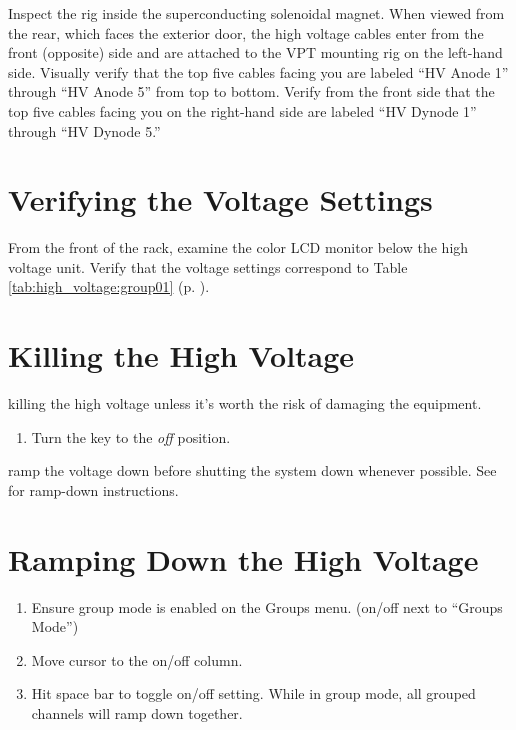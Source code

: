 Inspect the rig inside the superconducting solenoidal magnet.  When viewed from the rear, which faces the exterior door, the high voltage cables enter from the front (opposite) side and are attached to the VPT mounting rig on the left-hand side.  Visually verify that the top five cables facing you are labeled ``HV Anode 1'' through ``HV Anode 5'' from top to bottom.  Verify from the front side that the top five cables facing you on the right-hand side are labeled ``HV Dynode 1'' through ``HV Dynode 5.''

\section{Verifying the Voltage Settings}
\label{sec:op_high_voltage:verify_voltage}

From the front of the rack, examine the color LCD monitor below the high voltage unit.  Verify that the voltage settings correspond to Table \ref{tab:high_voltage:group01} (p. \pageref{tab:high_voltage:group01}).

\section{Killing the High Voltage}
\label{sec:op_high_voltage:kill}

\begin{avoid} killing the high voltage unless it's worth the risk of damaging the equipment.\end{avoid}

\begin{enumerate}
\item Turn the key to the \textit{off} position.
\end{enumerate}

\begin{pleasedo} ramp the voltage down before shutting the system down whenever possible.  See  for ramp-down instructions.\end{pleasedo}

\section{Ramping Down the High Voltage}
\label{sec:op_high_voltage:rampdown}

\begin{enumerate}
\item Ensure group mode is enabled on the Groups menu. (on/off next to ``Groups Mode'')
\item Move cursor to the on/off column.
\item Hit space bar to toggle on/off setting.  While in group mode, all grouped channels will ramp down together.
\end{enumerate}



